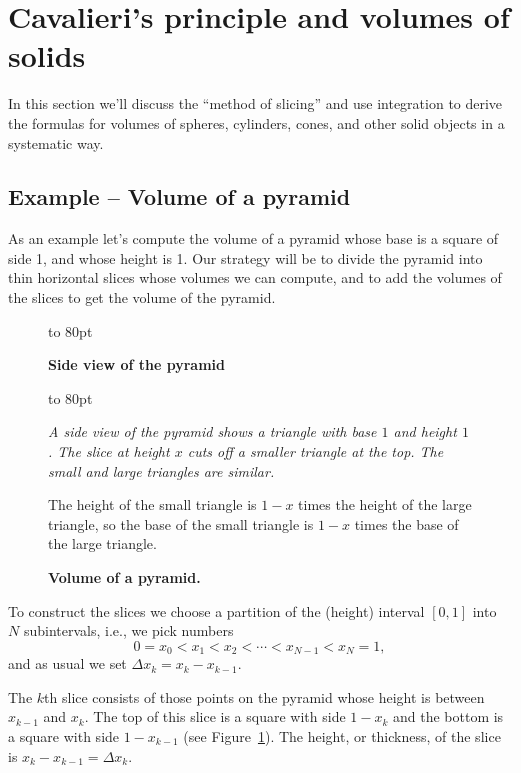 \section{Cavalieri's principle and volumes of solids} %
In this section we'll discuss the ``method of slicing'' and use integration to
derive the formulas for volumes of spheres, cylinders, cones, and other solid
objects in a systematic way.

\subsection{Example -- Volume of a pyramid} %
As an example let's compute the volume of a pyramid whose base is a square of
side 1, and whose height is 1.  Our strategy will be to divide the pyramid into
thin horizontal slices whose volumes we can compute, and to add the volumes of
the slices to get the volume of the pyramid.

\begin{figure}[ht]
  \centering
  \parbox[b][80pt][t]{190pt}{ }
  \hspace{35pt}
  \begin{minipage}[t]{130pt}
    \vbox to 80pt{\sffamily%
      \centerline{\bfseries\small Side view of the pyramid}  } \vbox to
    80pt{\footnotesize\sffamily\itshape%
      A side view of the pyramid shows a triangle with base $1$ and height $1$.
      The slice at height $x$ cuts off a smaller triangle at the top.  The small
      and large triangles are similar.

      The height of the small triangle is $1-x$ times the height of the large
      triangle, so the base of the small triangle is $1-x$ times the base of the
      large triangle.  }
  \end{minipage}
  \caption{\textbf{Volume of a pyramid. } }
  \label{fig:09pyramid}
\end{figure}

To construct the slices we choose a partition of the (height) interval $[0, 1]$
into $N$ subintervals, i.e., we pick numbers
\[
0=x_0<x_1<x_2<\cdots<x_{N-1}<x_N=1,
\]
and as usual we set $\Delta x_k = x_k-x_{k-1}$.

The $k$th slice consists of those points on the pyramid whose height is between
$x_{k-1}$ and $x_k$.  The top of this slice is a square with side $1-x_k$ and
the bottom is a square with side $1-x_{k-1}$ (see Figure~\ref{fig:09pyramid}).
The height, or thickness, of the slice is $x_k-x_{k-1} = \Delta x_k$.

